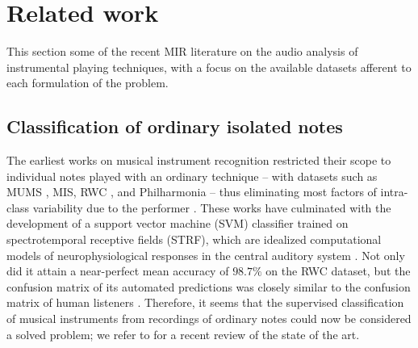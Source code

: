 \documentclass{article}
\begin{document}
\section{Related work}
This section some of the recent MIR literature on the audio analysis of instrumental playing techniques, 
with a focus on the available datasets afferent to each formulation of the problem.

\subsection{Classification of ordinary isolated notes}
The earliest works on musical instrument recognition restricted their scope to individual notes played with an ordinary technique -- with datasets such as MUMS \cite{opolko1989dataset}, MIS, RWC \cite{goto2003ismir}, and Philharmonia -- thus eliminating most factors of intra-class variability due to the performer  \cite{martin1998asa,brown1999jasa,eronen2000icassp,herrera2003jnmr,wieczorkowska2003jiis,kaminskyj2005jiis,benetos2006icassp}.
These works have culminated with the development of a support vector machine (SVM) classifier trained on spectrotemporal receptive fields (STRF), which are idealized computational models of neurophysiological responses in the central auditory system \cite{chi2005jasa}.
Not only did it attain a near-perfect mean accuracy of $98.7\%$ on the RWC dataset, but the confusion matrix of its automated predictions was closely similar to the confusion matrix of human listeners \cite{patil2012plos}.
Therefore, it seems that the supervised classification of musical instruments from recordings of ordinary notes could now be considered a solved problem; we refer to \cite{bhalke2016jiis} for a recent review of the state of the art.
\end{document}
